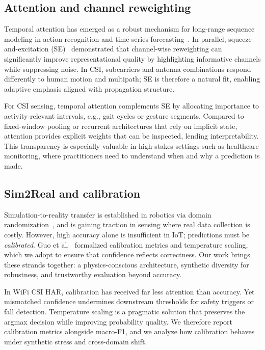 \documentclass[journal]{IEEEtran}
\begin{document}
\subsection{Attention and channel reweighting}
Temporal attention has emerged as a robust mechanism for long-range sequence modeling in action recognition and time-series forecasting~\cite{li2020tea,bertasius2021timesformer,lim2021tft,zhou2021informer}. In parallel, squeeze-and-excitation (SE)~\cite{se_networks2018} demonstrated that channel-wise reweighting can significantly improve representational quality by highlighting informative channels while suppressing noise. In CSI, subcarriers and antenna combinations respond differently to human motion and multipath; SE is therefore a natural fit, enabling adaptive emphasis aligned with propagation structure.

For CSI sensing, temporal attention complements SE by allocating importance to activity-relevant intervals, e.g., gait cycles or gesture segments. Compared to fixed-window pooling or recurrent architectures that rely on implicit state, attention provides explicit weights that can be inspected, lending interpretability. This transparency is especially valuable in high-stakes settings such as healthcare monitoring, where practitioners need to understand when and why a prediction is made.

\subsection{Sim2Real and calibration}
Simulation-to-reality transfer is established in robotics via domain randomization~\cite{peng2018sim2real}, and is gaining traction in sensing where real data collection is costly. However, high accuracy alone is insufficient in IoT; predictions must be \emph{calibrated}. Guo et al.~\cite{calibration_guo2017} formalized calibration metrics and temperature scaling, which we adopt to ensure that confidence reflects correctness. Our work brings these strands together: a physics-conscious architecture, synthetic diversity for robustness, and trustworthy evaluation beyond accuracy.

In WiFi CSI HAR, calibration has received far less attention than accuracy. Yet mismatched confidence undermines downstream thresholds for safety triggers or fall detection. Temperature scaling is a pragmatic solution that preserves the argmax decision while improving probability quality. We therefore report calibration metrics alongside macro-F1, and we analyze how calibration behaves under synthetic stress and cross-domain shift.
\end{document}
